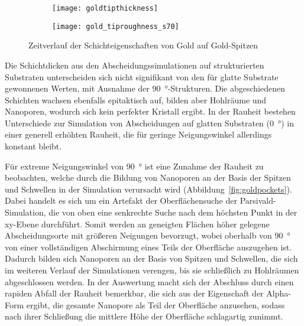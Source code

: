 \begin{figure}
  \captionsetup[subfigure]{singlelinecheck=false}
  \def\subfigwidth{0.49\textwidth}

  \begin{subfigure}[t]{\subfigwidth}
    \texttt{[image: goldtipthickness]}
    \label{fig:goldrough-a}
  \end{subfigure}
  \hfill
  \begin{subfigure}[t]{\subfigwidth}
    \texttt{[image: gold\_tiproughness\_s70]}
    \label{fig:goldrough-b}
  \end{subfigure}

  \caption[Schichteigenschaften von Gold auf Gold-Spitzen]{
    Zeitverlauf der Schichteigenschaften von Gold auf Gold-Spitzen
  }
  \label{fig:goldrough}

\end{figure}

Die Schichtdicken aus den Abscheidungssimulationen auf strukturierten Substraten unterscheiden sich nicht signifikant von den für glatte Substrate gewonnenen Werten, mit Ausnahme der \SI{90}{\degree}-Strukturen.
Die abgeschiedenen Schichten wachsen ebenfalls epitaktisch auf, bilden aber Hohlräume und Nanoporen, wodurch sich kein perfekter Kristall ergibt.
In der Rauheit bestehen Unterschiede zur Simulation von Abscheidungen auf glatten Substraten (\SI{0}{\degree}) in einer generell erhöhten Rauheit, die für geringe Neigungswinkel allerdings konstant bleibt.

Für extreme Neigungswinkel von \SI{90}{\degree} ist eine Zunahme der Rauheit zu beobachten, welche durch die Bildung von Nanoporen an der Basis der Spitzen und Schwellen in der Simulation verursacht wird (Abbildung~\ref{fig:goldpockets}).
Dabei handelt es sich um ein Artefakt der Oberflächensuche der Parsivald-Simulation, die von oben eine senkrechte Suche nach dem höchsten Punkt in der xy-Ebene durchführt.
Somit werden an geneigten Flächen höher gelegene Abscheidungsorte mit größeren Neigungen bevorzugt, wobei oberhalb von \SI{90}{\degree} von einer vollständigen Abschirmung eines Teils der Oberfläche auszugehen ist.
Dadurch bilden sich Nanoporen an der Basis von Spitzen und Schwellen, die sich im weiteren Verlauf der Simulationen verengen, bis sie schließlich zu Hohlräumen abgeschlossen werden.
In der Auswertung macht sich der Abschluss durch einen rapiden Abfall der Rauheit bemerkbar, die sich aus der Eigenschaft der Alpha-Form ergibt, die gesamte Nanopore als Teil der Oberfläche anzusehen, sodass nach ihrer Schließung die mittlere Höhe der Oberfläche schlagartig zunimmt.

